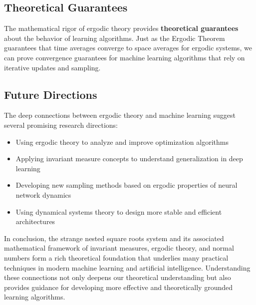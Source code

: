 \documentclass[12pt,a4paper]{article}
\begin{document}
\subsection{Theoretical Guarantees}

The mathematical rigor of ergodic theory provides \textbf{theoretical guarantees} about the behavior of learning algorithms. Just as the Ergodic Theorem guarantees that time averages converge to space averages for ergodic systems, we can prove convergence guarantees for machine learning algorithms that rely on iterative updates and sampling.

\subsection{Future Directions}

The deep connections between ergodic theory and machine learning suggest several promising research directions:

\begin{itemize}
    \item Using ergodic theory to analyze and improve optimization algorithms
    \item Applying invariant measure concepts to understand generalization in deep learning
    \item Developing new sampling methods based on ergodic properties of neural network dynamics
    \item Using dynamical systems theory to design more stable and efficient architectures
\end{itemize}

In conclusion, the strange nested square roots system and its associated mathematical framework of invariant measures, ergodic theory, and normal numbers form a rich theoretical foundation that underlies many practical techniques in modern machine learning and artificial intelligence. Understanding these connections not only deepens our theoretical understanding but also provides guidance for developing more effective and theoretically grounded learning algorithms.
\end{document}
